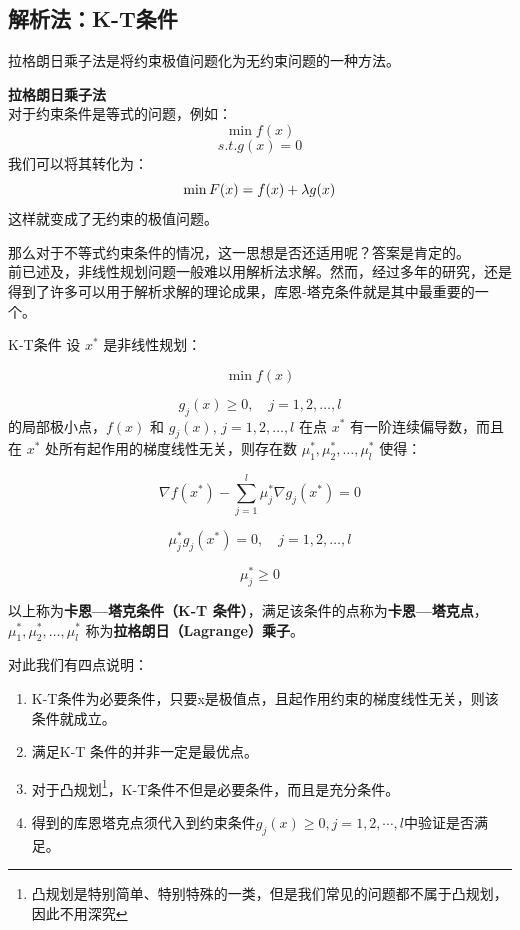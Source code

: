 \subsection{解析法：K-T条件}
\label{sec:K-T条件}
拉格朗日乘子法是将约束极值问题化为无约束问题的一种方法。\\
\begin{notebox}\textbf{{拉格朗日乘子法}}{}
\\对于约束条件是等式的问题，例如：
$$
\min f(x)
$$
$$
s.t. g(x)=0
$$
我们可以将其转化为：
$$
\min F(x)=f(x) + \lambda g(x)\\
$$
这样就变成了无约束的极值问题。
\end{notebox}
那么对于不等式约束条件的情况，这一思想是否还适用呢？答案是肯定的。\\
前已述及，非线性规划问题一般难以用解析法求解。然而，经过多年的研究，还是得到了许多可以用于解析求解的理论成果，库恩-塔克条件就是其中最重要的一个。
\begin{dfnbox}{K-T条件}{}
设 $x^*$ 是非线性规划：

\[
\min f(x)
\]

\[
g_j(x) \geq 0, \quad j = 1, 2, \dots, l
\]
的局部极小点，$f(x)$ 和 $g_j(x)$, $j = 1, 2, \dots, l$ 在点 $x^*$ 有一阶连续偏导数，而且在 $x^*$ 处所有起作用的梯度线性无关，则存在数 $\mu_1^*, \mu_2^*, \dots, \mu_l^*$ 使得：

\[
\nabla f(x^*) - \sum_{j=1}^{l} \mu_j^* \nabla g_j(x^*) = 0
\]

\[
\mu_j^* g_j(x^*) = 0, \quad j = 1, 2, \dots, l
\]

\[
\mu_j^* \geq 0
\]

以上称为\textbf{卡恩—塔克条件（K-T 条件）}，满足该条件的点称为\textbf{卡恩—塔克点}，$\mu_1^*, \mu_2^*, \dots, \mu_l^*$ 称为\textbf{拉格朗日（Lagrange）乘子}。
\end{dfnbox}
对此我们有四点说明：
\begin{enumerate}
    \item K-T条件为必要条件，只要x是极值点，且起作用约束的梯度线性无关，则该条件就成立。
    \item 满足K-T 条件的并非一定是最优点。
    \item 对于凸规划\footnote{凸规划是特别简单、特别特殊的一类，但是我们常见的问题都不属于凸规划，因此不用深究}，K-T条件不但是必要条件，而且是充分条件。
    \item 得到的库恩塔克点须代入到约束条件$g_j(x)\geq0,j=1,2,\cdots,l$中验证是否满足。
\end{enumerate}
